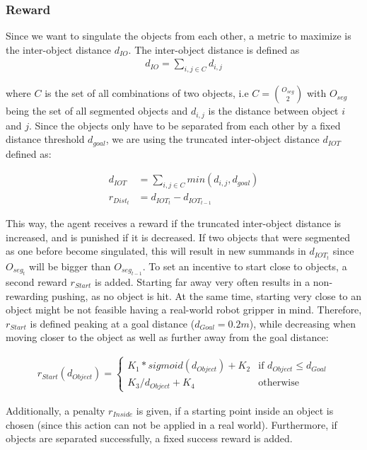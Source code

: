 \documentclass{article}
\begin{document}
\subsubsection{Reward}
Since we want to singulate the objects from each other, a metric to maximize is the inter-object distance $d_{IO}$. The inter-object distance is defined as 
\begin{align}
d_{IO} = \sum_{i,j\in C }^{} d_{i,j}
\end{align}
   
where $C$ is the set of all combinations of two objects, i.e $C = {O_{seg}\choose 2}$ with $O_{seg}$ being the set of all segmented objects and $d_{i,j}$ is the distance between object $i$ and $j$.
Since the objects only have to be separated from each other by a fixed distance threshold $d_{goal}$, we are using the truncated inter-object distance $d_{IOT}$ defined as: 

\begin{align}
d_{IOT} &= \sum_{i,j\in C }^{} min(d_{i,j},d_{goal}) \\ 
r_{Dist_t} &= d_{IOT_{t}}-d_{IOT_{t-1}}
\end{align}

This way, the agent receives a reward if the truncated inter-object distance is increased, and is punished if it is decreased. If two objects that were segmented as one before become singulated, this will result in new summands in $d_{IOT_t}$ since $O_{seg_t}$ will be bigger than $O_{seg_{t-1}}$.
\newline
To set an incentive to start close to objects, a second reward $r_{Start}$ is added. Starting far away very often results in a non-rewarding pushing, as no object is hit. At the same time, starting very close to an object might be not feasible having a real-world robot gripper in mind. Therefore, $r_{Start}$ is defined peaking at a goal distance ($d_{Goal}=0.2 m$), while decreasing when moving closer to the object as well as further away from the goal distance:

\begin{align}
r_{Start}(d_{Object}) = \begin{cases} 
K_1*sigmoid(d_{Object}) + K_2 & \text{if } d_{Object} \leq d_{Goal} \\
K_3/d_{Object} + K_4 & \text{otherwise}
\end{cases}
\end{align}

Additionally, a penalty $r_{Inside}$ is given, if a starting point inside an object is chosen (since this action can not be applied in a real world). Furthermore, if objects are separated successfully, a fixed success reward is added. 
\end{document}
